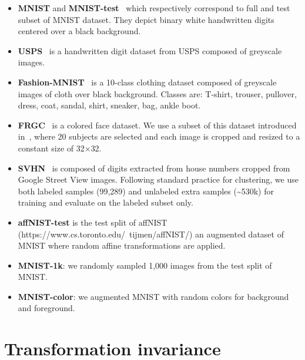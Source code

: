 \documentclass{article}
\begin{document}
\begin{itemize}[topsep=0pt,partopsep=0pt,parsep=0pt,leftmargin=7mm]
  \item \textbf{MNIST}  and {\bf MNIST-test}~\cite{lecunGradientBasedLearningApplied1998} 
    which respectively correspond to full and test subset of MNIST dataset. They depict 
    binary white handwritten digits centered over a black background.
  \item \textbf{USPS}~\cite{hastie01statisticallearning} is a handwritten digit dataset from  
    USPS composed of greyscale images.
  \item \textbf{Fashion-MNIST}~\cite{xiao2017fashion} is a 10-class 
    clothing dataset composed of greyscale images of cloth over black background. Classes 
    are: T-shirt, trouser, pullover, dress, coat, sandal, shirt, sneaker, bag, ankle boot.
  \item \textbf{FRGC}~\cite{FRGC} is a colored face dataset. We use a subset of this dataset
    introduced in~\cite{yangJointUnsupervisedLearning2016}, where 20 subjects are selected 
    and each image is cropped and resized to a constant size of 32$\times$32.
  \item \textbf{SVHN}~\cite{netzer2011reading} is composed of digits extracted from house 
    numbers cropped from Google Street View images. Following standard practice for
    clustering, we use both labeled samples (99,289) and unlabeled extra samples 
    (\textasciitilde 530k) for training and evaluate on the labeled subset only.
  \item \textbf{affNIST-test} is the test split of affNIST 
    (https://www.cs.toronto.edu/~tijmen/affNIST/) an augmented dataset of
    MNIST where random affine transformations are applied.
  \item \textbf{MNIST-1k}: we randomly sampled 1,000 images from the test split of MNIST.
  \item \textbf{MNIST-color}: we augmented MNIST with random colors for background and 
    foreground.
\end{itemize}

\section{Transformation invariance}\label{sec:proof}
\end{document}
